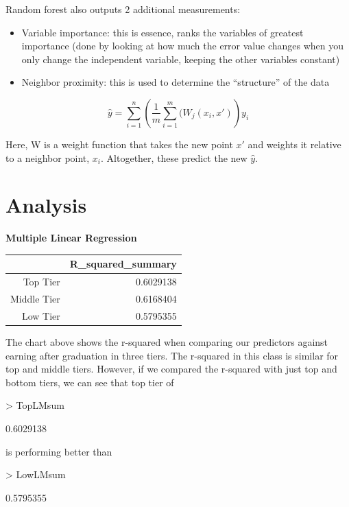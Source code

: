 \documentclass{article}
\begin{document}
Random forest also outputs 2 additional measurements:
\begin{itemize}
\item Variable importance: this is essence, ranks the variables of greatest importance (done by looking at how much the error value changes when you only change the independent variable, keeping the other variables constant)
\item Neighbor proximity: this is used to determine the ``structure'' of the data
\end{itemize}

$$\hat y =  \sum_{i=1}^{n} \left(\frac{1}{m} \sum_{i=1}^{m} (W_j(x_i,x')\right)y_i$$

Here, W is a weight function that takes the new point $x'$ and weights it relative to a neighbor point, $x_i$.  Altogether, these predict the new $\hat y$.



\section{Analysis}

\textbf{Multiple Linear Regression}\newline
\begin{table}[ht]
\centering
\begin{tabular}{rr}
  \hline
 & R\_squared\_summary \\ 
  \hline
Top Tier & 0.6029138 \\ 
  Middle Tier & 0.6168404 \\ 
  Low Tier & 0.5795355 \\ 
   \hline
\end{tabular}
\end{table}\newline
  The chart above shows the r-squared when comparing our predictors against earning after graduation in three tiers. The r-squared in this class is similar for top and middle tiers.  However, if we compared the r-squared with just top and bottom tiers, we can see that top tier of 
\begin{Schunk}
\begin{Sinput}
> TopLMsum
\end{Sinput}
\begin{Soutput}
[1] 0.6029138
\end{Soutput}
\end{Schunk}
is performing better than 
\begin{Schunk}
\begin{Sinput}
> LowLMsum
\end{Sinput}
\begin{Soutput}
[1] 0.5795355
\end{Soutput}
\end{Schunk}
\end{document}
